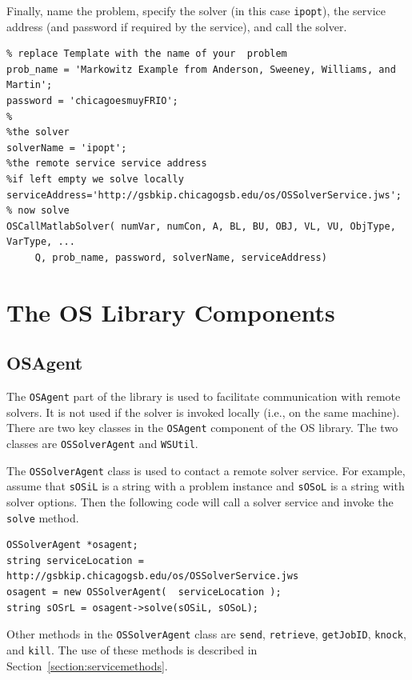 \documentclass[11pt]{article}
\renewcommand{\_}{{\char"5F}}
\renewcommand{\{}{{\char"7B}}
\renewcommand{\}}{{\char"7D}}
\renewcommand{\^}{{\char"0D}}
\renewcommand{\'}{{\char"0D}}
\begin{document}
\begin{enumerate}[Step 1:]
Finally, name the problem, specify the solver (in this case {\tt ipopt}), the service address (and password if required by the service), and call the solver.



\begin{verbatim}
% replace Template with the name of your  problem
prob_name = 'Markowitz Example from Anderson, Sweeney, Williams, and Martin';
password = 'chicagoesmuyFRIO';
%
%the solver
solverName = 'ipopt';
%the remote service service address
%if left empty we solve locally
serviceAddress='http://gsbkip.chicagogsb.edu/os/OSSolverService.jws';
% now solve
OSCallMatlabSolver( numVar, numCon, A, BL, BU, OBJ, VL, VU, ObjType, VarType, ...
     Q, prob_name, password, solverName, serviceAddress)
\end{verbatim}



\section{The OS Library Components}\label{section:oslibrary} 

\subsection{OSAgent}\label{section:osagent}

The {\tt OSAgent}  part of the library is used to facilitate communication
with remote solvers. It is not used if the solver is invoked locally (i.e., on the same machine).
There are two key classes in the {\tt OSAgent} component of the OS library. The two classes are
{\tt OSSolverAgent} and {\tt WSUtil}.

The {\tt OSSolverAgent} class is used to contact a remote solver service.  For example, assume that {\tt sOSiL}
is a string with a problem instance and {\tt sOSoL} is a string with solver options. Then the following code
will call a solver service and invoke the {\tt solve} method.
\begin{verbatim}
OSSolverAgent *osagent;
string serviceLocation = http://gsbkip.chicagogsb.edu/os/OSSolverService.jws
osagent = new OSSolverAgent(  serviceLocation );
string sOSrL = osagent->solve(sOSiL, sOSoL);
\end{verbatim}
Other methods in the {\tt OSSolverAgent} class are {\tt send}, {\tt retrieve}, {\tt getJobID}, {\tt knock}, and {\tt kill}.  The use of these methods is described in Section~\ref{section:servicemethods}.




\end{enumerate}
\end{document}
